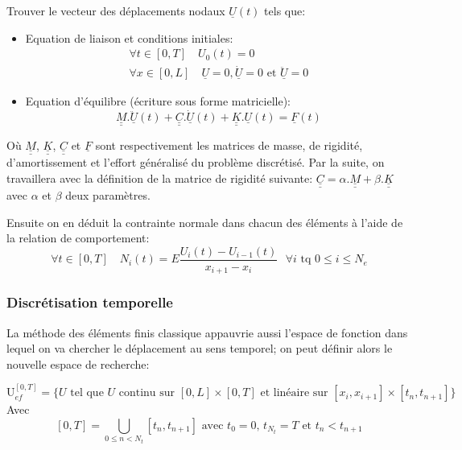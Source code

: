 \documentclass[fleqn]{article}
\begin{document}
\begin{it} 
	Trouver le vecteur des déplacements nodaux $\underline{U}(t)$ tels que:
\end{it}
\begin{itemize}
	\item Equation de liaison et conditions initiales:
		\begin{equation*}
			\begin{array}{l}
				\forall t \in \left[0,T\right] \quad U_0(t)=0\\
				\forall x \in \left[0,L\right] \quad \underline{U}=0, \underline{\dot{U}}=0 \mbox{ et }\underline{\ddot{U}}=0
			\end{array}
		\end{equation*}
	\item Equation d'équilibre (écriture sous forme matricielle):
		\begin{equation*}
			\underline{\underline{M}}.\underline{\ddot{U}}(t) + \underline{\underline{C}}.\underline{\dot{U}}(t) + \underline{\underline{K}}.\underline{U}(t) = \underline{F}(t)
		\end{equation*}
\end{itemize}
	Où $\underline{\underline{M}}$, $\underline{\underline{K}}$, $\underline{\underline{C}}$ et $\underline{F}$ sont respectivement les matrices de masse, de rigidité, d'amortissement et l'effort généralisé du problème discrétisé. 
	Par la suite,  on travaillera avec la définition de la matrice de rigidité suivante: $\underline{\underline{C}}=\alpha.\underline{\underline{M}} +\beta.\underline{\underline{K}}$ avec $\alpha$ et $\beta$ deux paramètres.


Ensuite on en déduit la contrainte normale dans chacun des éléments à l'aide de la relation de comportement:
		\begin{equation*}
			\forall t \in \left[ 0,T \right] \quad  N_i(t) = E \frac{U_{i}(t)-U_{i-1}(t)}{x_{i+1}-x_i} \mbox{ } \forall i \mbox{ tq } 0\leq i\leq N_e
		\end{equation*}

\subsubsection{Discrétisation temporelle}

La méthode des éléments finis classique appauvrie aussi l'espace de fonction dans lequel on va chercher le déplacement au sens temporel; on peut définir alors le nouvelle espace de recherche:

\begin{equation*}
	\mathrm{U}^{\left[ 0, T \right]}_{ef}=\{  U \mbox{ tel que } U \mbox{ continu sur }\left[ 0, L \right]\times\left[0,T\right] \mbox{ et linéaire sur } \left[ x_i,x_{i+1}\right]\times \left[ t_n,t_{n+1}\right]\}
\end{equation*}
Avec
\begin{equation*}
	\left[ 0,T \right]=  \bigcup_{0\leq n<N_t}   \left[t_n,t_{n+1}\right] \mbox{ avec } t_0=0 \mbox{, } t_{N_t}=T  \mbox{ et } t_n<t_{n+1}
\end{equation*}
		
\end{document}
